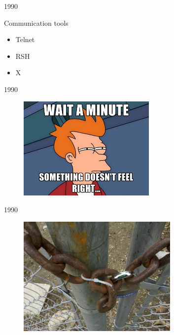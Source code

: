 \documentclass[10pt, compress, aspectratio=169]{beamer}
\begin{document}
\begin{frame}{1990}
  \begin{alertblock}{Communication tools}
    \begin{itemize}
      \item Telnet
      \item RSH
      \item X
    \end{itemize}
  \end{alertblock}
\end{frame}

\begin{frame}{1990}
  \begin{figure}[ht]
    \centering
    \includegraphics[width=0.6\textwidth, keepaspectratio=true]{images/wait.jpg}
  \end{figure}
\end{frame}

\begin{frame}{1990}
  \begin{figure}[ht]
    \centering
    \includegraphics[width=0.7\textwidth, keepaspectratio=true]{images/secure_fail.jpg}
  \end{figure}
\end{frame}
\end{document}
